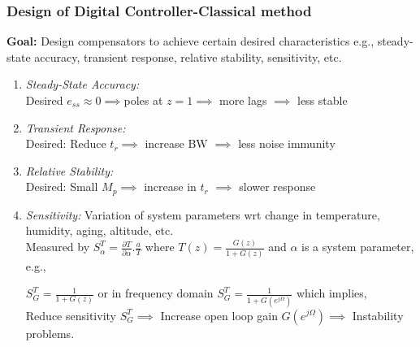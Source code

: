 \documentclass[mathserif, 10pt]{beamer} %
\begin{document}
\frame
{

\small
\frametitle{Design of Digital Controller-Classical method}
\textbf{Goal: } Design compensators to achieve certain desired characteristics e.g., steady-state accuracy, transient response, relative stability, sensitivity, etc.\\
\begin{enumerate}
	\item \textit{Steady-State Accuracy:} \\
	Desired $e_{ss} \approx 0 \implies $poles at $z=1 \implies$ more lags $\implies$ less stable
	\item \textit{Transient Response:}\\
	Desired:  Reduce $t_r \implies$ increase BW $\implies$ less noise immunity
	\item \textit{Relative Stability:}\\
	Desired:  Small $M_p \implies$ increase in $t_r$ $\implies$ slower response
	\item \textit{Sensitivity:} Variation of system parameters wrt change in temperature, humidity, aging, altitude, etc.\\
	Measured by $S_{\alpha}^{T}=\frac{\partial T}{\partial \alpha}.\frac{a}{T}$ where $T(z)=\frac{G(z)}{1+G(z)}$ and $\alpha$ is a system parameter, e.g.,  \\ \vspace{.1in}

$S_{G}^{T}= \frac{1}{1+G(z)}$ or in frequency domain $S_{G}^{T}= \frac{1}{1+G(e^{j\Omega})}$ which implies, \\ \vspace{.1in}
Reduce sensitivity $S_{G}^{T} \implies$ Increase open loop gain $G(e^{j\Omega}) \implies $ Instability problems.

\end{enumerate}


}
\end{document}

